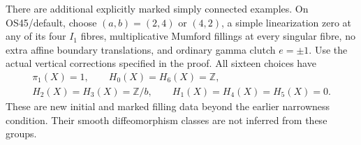 \begin{theorem}
There are additional explicitly marked simply connected examples.
On OS45/default, choose $(a,b)=(2,4)$ or $(4,2)$, a simple
linearization zero at any of its four $I_1$ fibres, multiplicative
Mumford fillings at every singular fibre, no extra affine boundary
translations, and ordinary gamma clutch $e=\pm1$. Use the actual
vertical corrections specified in the proof. All sixteen choices have
\[
 \begin{gathered}
 \pi_1(X)=1,\qquad H_0(X)=H_6(X)=\mathbb Z,\\
 H_2(X)=H_3(X)=\mathbb Z/b,\qquad
 H_1(X)=H_4(X)=H_5(X)=0 .
 \end{gathered}                                             \tag{D.VC7}\label{maps:eq:D.VC7}
\]
These are new initial and marked filling data beyond the earlier
narrowness condition. Their smooth diffeomorphism classes are not
inferred from these groups.

\end{theorem}


